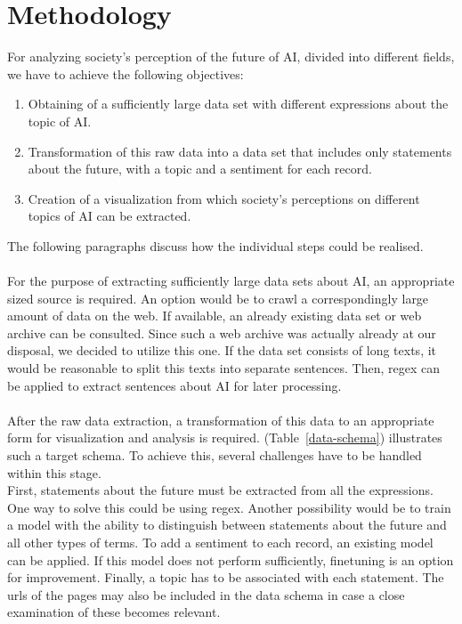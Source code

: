 \section{Methodology}

For analyzing society's perception of the future of AI, divided into different fields, we have to achieve the following objectives:

\begin{enumerate}
    \item Obtaining of a sufficiently large data set with different expressions about the topic of AI.
    \item Transformation of this raw data into a data set that includes only statements about the future, with a topic and a sentiment for each record.
    \item Creation of a visualization from which society's perceptions on different topics of AI can be extracted.
\end{enumerate}%
%
The following paragraphs discuss how the individual steps could be realised.
\\
\\
For the purpose of extracting sufficiently large data sets about AI, an appropriate sized source is required.
An option would be to crawl a correspondingly large amount of data on the web.
If available, an already existing data set or web archive can be consulted.
Since such a web archive was actually already at our disposal, we decided to utilize this one.
If the data set consists of long texts, it would be reasonable to split this texts into separate sentences.
Then, regex can be applied to extract sentences about AI for later processing.
\\
\\
After the raw data extraction, a transformation of this data to an appropriate form for visualization and analysis is required.
(Table~\ref{data-schema}) illustrates such a target schema.
To achieve this, several challenges have to be handled within this stage.
\\
First, statements about the future must be extracted from all the expressions.
One way to solve this could be using regex.
Another possibility would be to train a model with the ability to distinguish between statements about the future and all other types of terms.
To add a sentiment to each record, an existing model can be applied.
If this model does not perform sufficiently, finetuning is an option for improvement.
Finally, a topic has to be associated with each statement.
The urls of the pages may also be included in the data schema in case a close examination of these becomes relevant.
